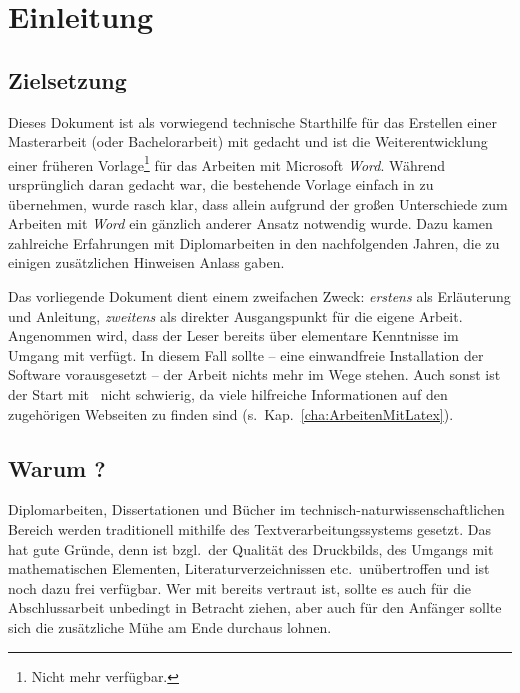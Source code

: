 \chapter{Einleitung}
\label{cha:Einleitung}

\section{Zielsetzung}
Dieses Dokument ist als vorwiegend technische Starthilfe für das
Erstellen einer Masterarbeit (oder Bachelorarbeit) mit \latex
gedacht und ist die Weiterentwicklung einer früheren
Vorlage\footnote{Nicht mehr verfügbar.} für das Arbeiten mit
Microsoft \emph{Word}. Während ursprünglich daran gedacht war, die
bestehende Vorlage einfach in \latex zu übernehmen, wurde rasch
klar, dass allein aufgrund der großen Unterschiede zum Arbeiten
mit \emph{Word} ein gänzlich anderer Ansatz notwendig wurde. Dazu
kamen zahlreiche Erfahrungen mit Diplomarbeiten in den
nachfolgenden Jahren, die zu einigen zusätzlichen Hinweisen Anlass gaben.

Das vorliegende Dokument dient einem zweifachen Zweck: 
\emph{erstens} als Erläuterung und Anleitung, \emph{zweitens} als
direkter Ausgangspunkt für die eigene Arbeit. Angenommen wird,
dass der Leser bereits über elementare Kenntnisse im Umgang mit
\latex verfügt. In diesem Fall sollte -- eine einwandfreie
Installation der Software vorausgesetzt -- der Arbeit nichts mehr
im Wege stehen. Auch sonst ist der Start mit \latex\ nicht
schwierig, da viele hilfreiche Informationen auf den zugehörigen
Webseiten zu finden sind (s.\ Kap.~\ref{cha:ArbeitenMitLatex}).





\section{Warum {\latex}?}

Diplomarbeiten, Dissertationen und Bücher im
technisch-natur\-wissen\-schaft\-lichen Bereich werden
traditionell mithilfe des Textverarbeitungssystems \latex
\cite{Lamport1994, Lamport1995} gesetzt. Das hat gute Gründe, denn
\latex ist bzgl.\ der Qualität des Druckbilds, des Umgangs mit
mathematischen Elementen, Literaturverzeichnissen etc.\
unübertroffen und ist noch dazu frei verfügbar. Wer mit \latex
bereits vertraut ist, sollte es auch für die Abschlussarbeit
unbedingt in Betracht ziehen, aber auch für den Anfänger sollte
sich die zusätzliche Mühe am Ende durchaus lohnen.

